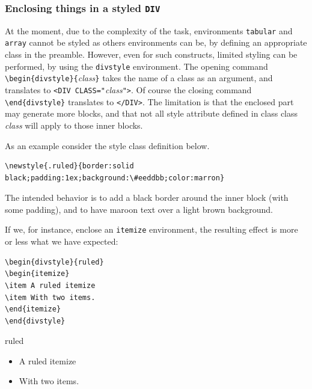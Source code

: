 \subsubsection{Enclosing things in a styled \texttt{DIV}}
%
%
At the moment, due to the complexity of the task, environments
\texttt{tabular} and \texttt{array} cannot be styled as others
environments can be, 
by defining an appropriate class in the preamble.
However, even for such constructs,
limited styling can be performed, by using
the \texttt{divstyle} environment.
The opening command \verb+\begin{divstyle}{+\textit{class}\verb+}+
takes the name of a class as
an argument, and translates to \verb+<DIV CLASS="+\textit{class}\verb+">+.
Of course the closing command \verb+\end{divstyle}+ translates to
\verb+</DIV>+.
The limitation is that the enclosed part may generate more {\html}
blocks, and that not all style attribute defined in class class
\textit{class} will apply to those inner blocks.

As an example consider the style class definition below.
\begin{verbatim}
\newstyle{.ruled}{border:solid black;padding:1ex;background:\#eeddbb;color:marron}
\end{verbatim}
The intended behavior is to add a black border around the inner block
(with some padding), and to have {\ifhevea\maroon maroon\else\fi} text over
a light brown background.

If we, for instance, enclose an \texttt{itemize} environment, the
resulting effect is more or less what we have expected:
\begin{verbatim}
\begin{divstyle}{ruled}
\begin{itemize}
\item A ruled itemize
\item With two items.
\end{itemize}
\end{divstyle}
\end{verbatim}
\begin{htmlonly}
\begin{divstyle}{ruled}
\begin{itemize}
\item A ruled itemize
\item With two items.
\end{itemize}
\end{divstyle}
\end{htmlonly}

